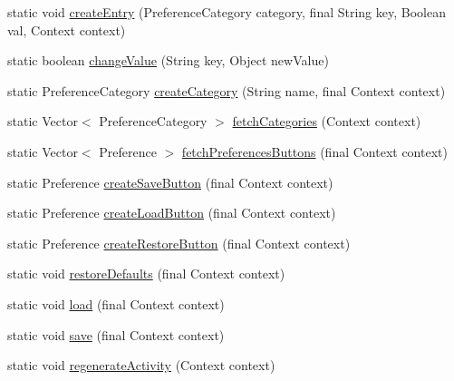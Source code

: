 \begin{DoxyCompactItemize}
\item 
static void \hyperlink{classpt_1_1lsts_1_1asa_1_1settings_1_1SettingsFactory_a756bf687a7cb10fcdec9a218d124c77b}{create\+Entry} (Preference\+Category category, final String key, Boolean val, Context context)
\item 
static boolean \hyperlink{classpt_1_1lsts_1_1asa_1_1settings_1_1SettingsFactory_aed8dda3c2a8ff3ee10a145ca349a0968}{change\+Value} (String key, Object new\+Value)
\item 
static Preference\+Category \hyperlink{classpt_1_1lsts_1_1asa_1_1settings_1_1SettingsFactory_a94a6f84774d239e7d823acc7a2bdf00b}{create\+Category} (String name, final Context context)
\item 
static Vector$<$ Preference\+Category $>$ \hyperlink{classpt_1_1lsts_1_1asa_1_1settings_1_1SettingsFactory_a88146718a94d0e869b99b9bbdc20c28f}{fetch\+Categories} (Context context)
\item 
static Vector$<$ Preference $>$ \hyperlink{classpt_1_1lsts_1_1asa_1_1settings_1_1SettingsFactory_a32091b71d0d888f665cd4d4fc89e4f21}{fetch\+Preferences\+Buttons} (final Context context)
\item 
static Preference \hyperlink{classpt_1_1lsts_1_1asa_1_1settings_1_1SettingsFactory_abbb0c140ecffff3789edd18cef67d028}{create\+Save\+Button} (final Context context)
\item 
static Preference \hyperlink{classpt_1_1lsts_1_1asa_1_1settings_1_1SettingsFactory_a99843313daf6ea97f2e7014ce42ffd00}{create\+Load\+Button} (final Context context)
\item 
static Preference \hyperlink{classpt_1_1lsts_1_1asa_1_1settings_1_1SettingsFactory_ab1e8f50825b877fd8eadd197a4333996}{create\+Restore\+Button} (final Context context)
\item 
static void \hyperlink{classpt_1_1lsts_1_1asa_1_1settings_1_1SettingsFactory_a5db302d8f472b17dd61cbd5b0928812f}{restore\+Defaults} (final Context context)
\item 
static void \hyperlink{classpt_1_1lsts_1_1asa_1_1settings_1_1SettingsFactory_a617dc330ef928d5835368be14931f795}{load} (final Context context)
\item 
static void \hyperlink{classpt_1_1lsts_1_1asa_1_1settings_1_1SettingsFactory_a1cc73da18f95cfec5d5f2f1e4c0a3707}{save} (final Context context)
\item 
static void \hyperlink{classpt_1_1lsts_1_1asa_1_1settings_1_1SettingsFactory_a0ae2053082573c19e692b45e3d414798}{regenerate\+Activity} (Context context)
\end{DoxyCompactItemize}



